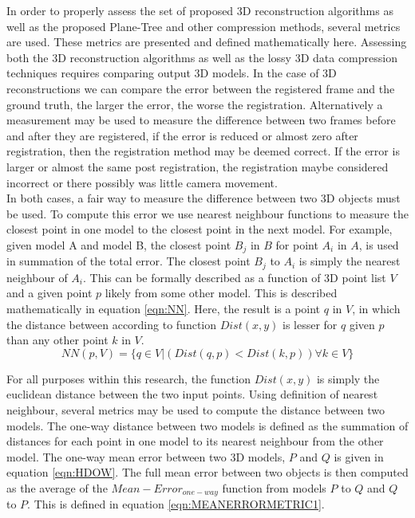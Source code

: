 
In order to properly assess the set of proposed 3D reconstruction algorithms as well as the proposed Plane-Tree and other compression methods, several metrics are used. These metrics are presented and defined mathematically here. Assessing both the 3D reconstruction algorithms as well as the lossy 3D data compression techniques requires comparing output 3D models. In the case of 3D reconstructions we can compare the error between the registered frame and the ground truth, the larger the error, the worse the registration. Alternatively a measurement may be used to measure the difference between two frames before and after they are registered, if the error is reduced or almost zero after registration, then the registration method may be deemed correct. If the error is larger or almost the same post registration, the registration maybe considered incorrect or there possibly was little camera movement. \\


In both cases, a fair way to measure the difference between two 3D objects must be used. To compute this error we use nearest neighbour functions to measure the closest point in one model to the closest point in the next model. For example, given model A and model B, the closest point $B_j$ in $B$ for point $A_i$ in $A$, is used in summation of the total error. The closest point $B_j$ to $A_i$ is simply the nearest neighbour of $A_i$. This can be formally described as a function of 3D point list $V$ and a given point $p$ likely from some other model. This is described mathematically in equation \ref{eqn:NN}. Here, the result is a point $q$ in $V$, in which the distance between according to function $Dist(x,y)$ is lesser for $q$ given $p$ than any other point $k$ in $V$.  \\

\begin{equation} \label{eqn:NN}
NN(p, V) =  \{ q \in V | (Dist(q, p) < Dist(k, p))  \forall k \in V \}
\end{equation}

For all purposes within this research, the function $Dist(x,y)$ is simply the euclidean distance between the two input points. Using definition of nearest neighbour, several metrics may be used to compute the distance between two models. The one-way distance between two models is defined as the summation of distances for each point in one model to its nearest neighbour from the other model. The one-way mean error between two 3D models, $P$ and $Q$ is given in equation \ref{eqn:HDOW}. The full mean error between two objects is then computed as the average of the $Mean-Error_{one-way}$ function from models $P$ to $Q$ and $Q$ to $P$. This is defined in equation \ref{eqn:MEANERRORMETRIC1}. \\


